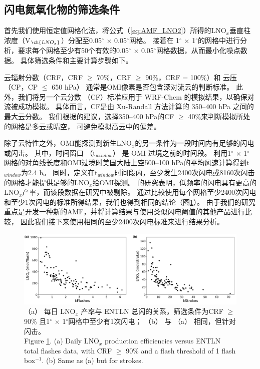 \subsection{闪电氮氧化物的筛选条件}

首先我们使用恒定值网格化法，将公式（\ref{eq:AMF_LNO2}）所得的LNO$_x$垂直柱浓度（V$_{\ch{LNO_x}}$）分配至0.05$^{\circ}$ $\times$ 0.05$^{\circ}$网格\citep{Kuhlmann.2014}。
接着在 1$^{\circ}$ $\times$ 1$^{\circ}$的网格中进行分析，要求每个网格至少有50个有效的0.05$^{\circ}$ $\times$ 0.05$^{\circ}$网格数据，从而最小化噪点数据。
具体筛选条件和主要计算步骤如下。

云辐射分数（CRF，CRF $\geq$ 70\%，CRF $\geq$ 90\%，CRF = 100\%）和 云压（CP，CP $\leq$ 650 hPa）
通常是OMI像素是否包含深对流云的判断标准\citep{Ziemke.2009,Choi.2014,Pickering.2016}。
此外，我们将另一个云分数 （CF）标准应用于 WRF-Chem 的模拟结果，以确保对流被成功模拟。
具体而言，CF是由 Xu-Randall 方法计算的 350--400 hPa 之间的最大云分数\citep{Xu.1996,Strode.2017}。
我们根据\citet{Strode.2017}的建议，选择350--400 hPa的CF $\geq$ 40\%来判断模拟所处的网格是多云或晴空，
可避免模拟高云中的偏差。

除了云特性之外，OMI能探测到新生LNO$_x$的另一条件为一段时间内有足够的闪电或闪击。
其中，时间窗口 （t$_{window}$） 是 OMI 过境之前的时间段。
\citet{Lapierre.2020}利用1$^{\circ}$ $\times$ 1$^{\circ}$网格的对角线长度和OMI过境时美国大陆上空500--100 hPa的平均风速计算得到t$_{window}$为2.4 h。
同时，\citet{Lapierre.2020}定义在t$_{window}$时间段内，至少发生2400次闪电或8160次闪击的网格才能提供足够的LNO$_x$给OMI探测。
\citet{Bucsela.2019}的研究表明，低频率的闪电具有更高的LNO$_x$产率，而该段数据在\citet{Lapierre.2020}研究中被剔除。
通过比较使用每个网格至少2400次闪电和至少1次闪电的标准所得结果，我们也得到相同的结论（图\ref{fig:us_flash_threshold}）。
由于我们的研究重点是开发一种新的AMF，并将计算结果与使用类似闪电阈值的其他产品进行比较\citep{Pickering.2016,Lapierre.2020}，
因此我们接下来使用相同的至少2400次闪电标准来进行结果分析。


\begin{figure}[!htbp]
    \includegraphics[width=15cm]{./figures/us_flash_threshold.png}
    \caption{
    （a） 每日 LNO$_x$ 产率与 ENTLN 总闪的关系，筛选条件为CRF $\geq$ 90\% 且1$^{\circ}$ $\times$ 1$^{\circ}$网格中至少有1次闪电；
     （b） 与 （a） 相同，但针对闪击。\\
    Figure \ref{fig:us_flash_threshold}. (a) Daily LNO$_x$ production efficiencies versus ENTLN total flashes data, with CRF $\geq$ 90\% and a flash threshold of 1 flash box$^{-1}$.
    (b) Same as (a) but for strokes.}
    \label{fig:us_flash_threshold}
\end{figure}


